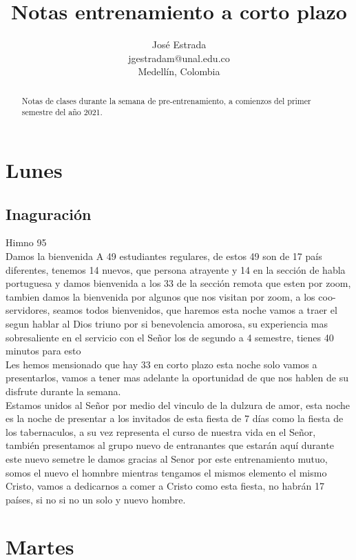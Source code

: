 \documentclass[12pt]{article}
\title{Notas entrenamiento a corto plazo}
\author{José Estrada\\
  \small jgestradam@unal.edu.co\\
  \small Medellín, Colombia
  \date{}
}
\begin{document}
\maketitle

 
\begin{abstract}
Notas de clases durante la semana de pre-entrenamiento, a comienzos del primer semestre del año 2021.
\end{abstract}


\section*{Lunes}

\subsection*{Inaguración}

Himno 95\\

Damos la bienvenida A 49 estudiantes regulares, de estos 49 son de 17 país diferentes, tenemos 14 nuevos, que persona atrayente y 14 en la sección de habla portuguesa y damos bienvenida a los 33 de la sección remota que esten por zoom, tambien damos la bienvenida por algunos que nos visitan por zoom, a los coo-servidores, seamos todos bienvenidos, que haremos esta noche vamos a traer el segun hablar al Dios triuno por si benevolencia amorosa, su experiencia mas sobresaliente en el servicio con el Señor los de segundo a 4 semestre, tienes 40 minutos para esto\\

Les hemos mensionado que hay 33 en corto plazo esta noche solo vamos a presentarlos, vamos a tener mas adelante la oportunidad de que nos hablen de su disfrute durante la semana.\\

Estamos unidos al Señor por medio del vinculo de la dulzura de amor, esta noche es la noche de presentar a los invitados de esta fiesta de 7 días como la fiesta de los tabernaculos, a su vez representa el curso de nuestra vida en el Señor, también presentamos al grupo nuevo de entranantes que estarán aquí durante este nuevo semetre le damos gracias al Senor por este entrenamiento mutuo, somos el nuevo el homnbre mientras tengamos el mismos elemento el mismo Cristo, vamos a dedicarnos a comer a Cristo como esta fiesta, no habrán 17 países, si no si no un solo y nuevo hombre.


\section*{Martes}
\end{document}
